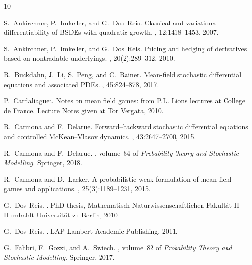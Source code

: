 \documentclass[12,english]{amsart}
\theoremstyle{plain}
\theoremstyle{definition}
\theoremstyle{plain}
\theoremstyle{plain}
\theoremstyle{remark}
\begin{document}
\begin{thebibliography}{10}

S.~Ankirchner, P.~Imkeller, and G.~Dos~Reis.
\newblock Classical and variational differentiability of {BSDEs} with quadratic
  growth.
, 12:1418--1453, 2007.

S.~Ankirchner, P.~Imkeller, and G.~Dos~Reis.
\newblock Pricing and hedging of derivatives based on nontradable underlyings.
, 20(2):289--312, 2010.

R.~Buckdahn, J.~Li, S.~Peng, and C.~Rainer.
\newblock Mean-field stochastic differential equations and associated {PDEs}.
, 45:824--878, 2017.

P.~Cardaliaguet.
\newblock Notes on mean field games: from {P.L. Lions} lectures at {C}ollege de
  {F}rance.
\newblock Lecture Notes given at Tor Vergata, 2010.

R.~Carmona and F.~Delarue.
\newblock Forward--backward stochastic differential equations and controlled
  {McKean}--{Vlasov} dynamics.
, 43:2647--2700, 2015.

R.~Carmona and F.~Delarue.
,
  volume~84 of {\em Probability theory and Stochastic Modelling}.
\newblock Springer, 2018.

R.~Carmona and D.~Lacker.
\newblock A probabilistic weak formulation of mean field games and
  applications.
, 25(3):1189--1231, 2015.

G.~Dos~Reis.
.
\newblock PhD thesis, Mathematisch-Naturwissenschaftlichen Fakult{\"a}t II
  Humboldt-Universit{\"a}t zu Berlin, 2010.

G.~Dos~Reis.
.
\newblock LAP Lambert Academic Publishing, 2011.

G.~Fabbri, F.~Gozzi, and A.~Swiech.
, volume~82 of
  {\em Probability Theory and Stochastic Modelling}.
\newblock Springer, 2017.


\end{thebibliography}
\end{document}
